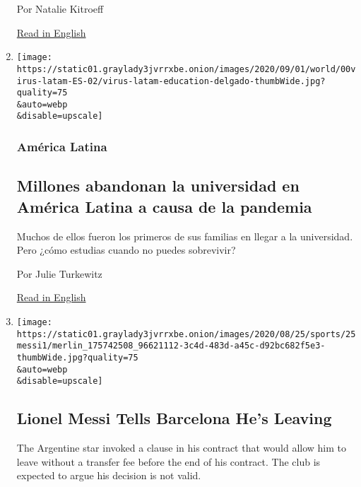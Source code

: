 \begin{enumerate}
  Por Natalie Kitroeff

  \href{https://www.nytimes3xbfgragh.onion/2020/09/05/world/americas/mexico-mayor-amlo-sheinbaum.html}{Read
  in English}
\item
  \href{/es/2020/09/04/espanol/america-latina/crisis-universidades-coronavirus.html}{}

  \texttt{[image: https://static01.graylady3jvrrxbe.onion/images/2020/09/01/world/00virus-latam-ES-02/virus-latam-education-delgado-thumbWide.jpg?quality=75\\\&auto=webp\\\&disable=upscale]}

  \hypertarget{amuxe9rica-latina-3}{%
  \subsubsection{América Latina}\label{amuxe9rica-latina-3}}

  \hypertarget{millones-abandonan-la-universidad-en-amuxe9rica-latina-a-causa-de-la-pandemia}{%
  \subsection{Millones abandonan la universidad en América Latina a
  causa de la
  pandemia}\label{millones-abandonan-la-universidad-en-amuxe9rica-latina-a-causa-de-la-pandemia}}

  Muchos de ellos fueron los primeros de sus familias en llegar a la
  universidad. Pero ¿cómo estudias cuando no puedes sobrevivir?

  Por Julie Turkewitz

  \href{https://www.nytimes3xbfgragh.onion/2020/09/04/world/americas/latin-america-education.html}{Read
  in English}
\item
  \href{/2020/08/25/sports/soccer/lionel-messi-barcelona.html}{}

  \texttt{[image: https://static01.graylady3jvrrxbe.onion/images/2020/08/25/sports/25messi1/merlin\_175742508\_96621112-3c4d-483d-a45c-d92bc682f5e3-thumbWide.jpg?quality=75\\\&auto=webp\\\&disable=upscale]}

  \hypertarget{lionel-messi-tells-barcelona-hes-leaving}{%
  \subsection{Lionel Messi Tells Barcelona He's
  Leaving}\label{lionel-messi-tells-barcelona-hes-leaving}}

  The Argentine star invoked a clause in his contract that would allow
  him to leave without a transfer fee before the end of his contract.
  The club is expected to argue his decision is not valid.


\end{enumerate}
